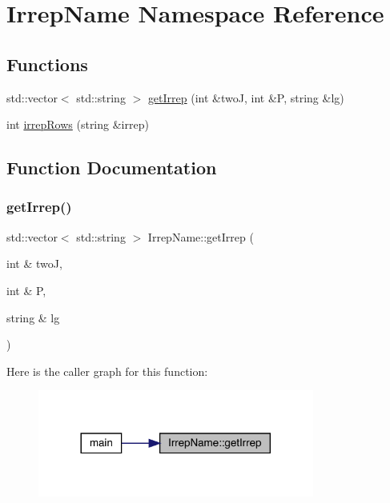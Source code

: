 \hypertarget{namespaceIrrepName}{}\section{Irrep\+Name Namespace Reference}
\label{namespaceIrrepName}
\subsection*{Functions}
\begin{DoxyCompactItemize}
\item 
std\+::vector$<$ std\+::string $>$ \mbox{\hyperlink{namespaceIrrepName_aafd6a227d49ac073e93e6954332007bf}{get\+Irrep}} (int \&twoJ, int \&P, string \&lg)
\item 
int \mbox{\hyperlink{namespaceIrrepName_a3964736788de2a425b5a41ff069f907b}{irrep\+Rows}} (string \&irrep)
\end{DoxyCompactItemize}


\subsection{Function Documentation}
\mbox{\label{namespaceIrrepName_aafd6a227d49ac073e93e6954332007bf}} 
\subsubsection{\texorpdfstring{getIrrep()}{getIrrep()}}
{\footnotesize\ttfamily std\+::vector$<$ std\+::string $>$ Irrep\+Name\+::get\+Irrep (\begin{DoxyParamCaption}\item[{int \&}]{twoJ,  }\item[{int \&}]{P,  }\item[{string \&}]{lg }\end{DoxyParamCaption})}

Here is the caller graph for this function\+:
\nopagebreak
\begin{figure}[H]
\begin{center}
\leavevmode
\includegraphics[width=257pt]{d8/dcc/namespaceIrrepName_aafd6a227d49ac073e93e6954332007bf_icgraph}
\end{center}
\end{figure}
\mbox{\label{namespaceIrrepName_a3964736788de2a425b5a41ff069f907b}} 

